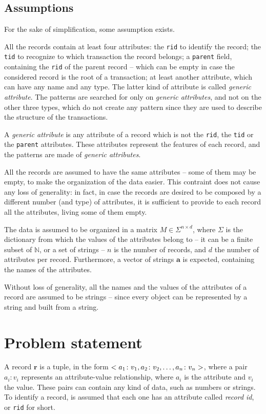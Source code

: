 \documentclass{acm_proc_article-sp-sigmod09}
\begin{document}
\subsection{Assumptions}
\label{sec:assumptions}
For the sake of simplification, some assumption exists.

All the records contain at least four attributes: the \texttt{rid} to identify the record; the \texttt{tid} to recognize to which transaction the record belongs; a \texttt{parent} field, containing the \texttt{rid} of the parent record -- which can be empty in case the considered record is the root of a transaction; at least another attribute, which can have any name and any type. The latter kind of attribute is called \emph{generic attribute}. The patterns are searched for only on \emph{generic attributes}, and not on the other three types, which do not create any pattern since they are used to describe the structure of the transactions.

\begin{definition}
A \emph{generic attribute} is any attribute of a record which is not the \texttt{rid}, the \texttt{tid} or the \texttt{parent} attributes. These attributes represent the features of each record, and the patterns are made of \emph{generic attributes}.
\end{definition}

All the records are assumed to have the same attributes -- some of them may be empty, to make the organization of the data easier. This contraint does not cause any loss of generality: in fact, in case the records are desired to be composed by a different number (and type) of attributes, it is sufficient to provide to each record all the attributes, living some of them empty.

The data is assumed to be organized in a matrix $M \in \Sigma^{n \times d}$, where $\Sigma$ is the dictionary from which the values of the attributes belong to -- it can be a finite subset of $\mathbb{N}$, or a set of strings -- $n$ is the number of records, and $d$ the number of attributes per record. Furthermore, a vector of strings $\boldsymbol{a}$ is expected, containing the names of the attributes.

Without loss of generality, all the names and the values of the attributes of a record are assumed to be strings -- since every object can be represented by a string and built from a string.

\section{Problem statement}
A record $\boldsymbol{r}$ is a tuple, in the form $<a_1 \colon v_1, a_2 \colon v_2, \text{\dots}, a_n \colon v_n>$, where a pair $a_i \colon v_i$ represents an attribute-value relationship, where $a_i$ is the attribute and $v_i$ the value. These pairs can contain any kind of data, such as numbers or strings. To identify a record, is assumed that each one has an attribute called \emph{record id}, or \texttt{rid} for short.
\end{document}
